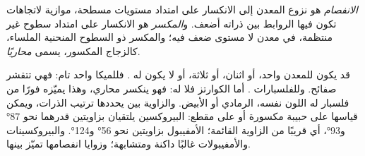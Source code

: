 \begin{definition}\label{def:g11:minerals:cleavage}
\emph{الانفصام} هو نزوع المعدن
إلى الانكسار على امتداد مستويات مسطحة، موازية لاتجاهات تكون فيها الروابط
بين ذراته أضعف. و\emph{المكسر}
هو الانكسار على امتداد سطوح غير منتظمة، في معدن لا مستوى
ضعف فيه؛ والمكسر ذو السطوح المنحنية الملساء، كالزجاج المكسور،
يسمى \emph{محاريًا}.
\end{definition}

قد يكون للمعدن  واحد، أو اثنان، أو ثلاثة، أو لا يكون له . فللميكا  واحد تام:
فهي تتقشر صفائح. وللفلسبارات . أما الكوارتز فلا  له: فهو ينكسر 
محاري، وهذا يميّزه فورًا من فلسبار له اللون نفسه، الرمادي
أو الأبيض. والزاوية بين  يحددها ترتيب
الذرات، ويمكن قياسها على حبيبة مكسورة أو على مقطع: 
البيروكسين يلتقيان بزاويتين قدرهما نحو \ang{87} و\ang{93}، أي قريبًا من الزاوية
القائمة؛  الأمفيبول بزاويتين نحو \ang{56} و\ang{124}. والبيروكسينات
والأمفيبولات غالبًا داكنة ومتشابهة؛ وزوايا انفصامها تميّز بينها.

